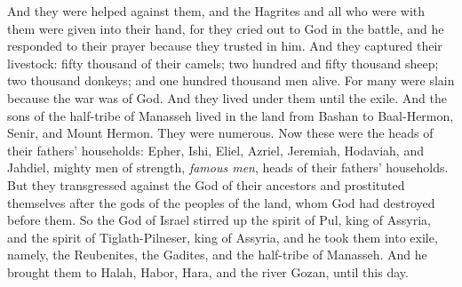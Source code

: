 \begin{biblechapter}
\verse And they were helped against them, and the Hagrites and all who were with them were given into their hand, for they cried out to God in the battle, and he responded to their prayer because they trusted in him.
\verse And they captured their livestock: fifty thousand of their camels; two hundred and fifty thousand sheep; two thousand donkeys; and one hundred thousand men alive.
\verse For many were slain because the war was of God. And they lived under them until the exile.
 And the sons of the half-tribe of Manasseh lived in the land from Bashan to Baal-Hermon, Senir, and Mount Hermon. They were numerous.
\verse Now these were the heads of their fathers’ households: Epher, Ishi, Eliel, Azriel, Jeremiah, Hodaviah, and Jahdiel, mighty men of strength, \textit{famous men}, heads of their fathers’ households.
\verse But they transgressed against the God of their ancestors and prostituted themselves after the gods of the peoples of the land, whom God had destroyed before them.
\verse So the God of Israel stirred up the spirit of Pul, king of Assyria, and the spirit of Tiglath-Pilneser, king of Assyria, and he took them into exile, namely, the Reubenites, the Gadites, and the half-tribe of Manasseh. And he brought them to Halah, Habor, Hara, and the river Gozan, until this day.
\end{biblechapter}

